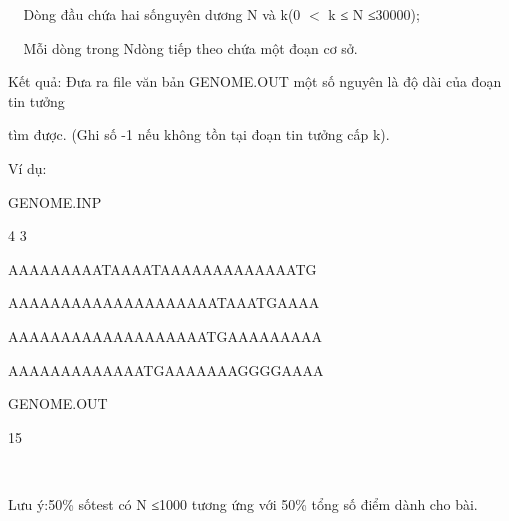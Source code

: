   Dòng đầu chứa hai sốnguyên dương N và k(0 $<$ k ≤ N ≤30000); 

  Mỗi dòng trong Ndòng tiếp theo chứa một đoạn cơ sở.

Kết quả: Đưa ra file văn bản GENOME.OUT một số nguyên là độ dài của đoạn tin tưởng 

tìm được. (Ghi số -1 nếu không tồn tại đoạn tin tưởng cấp k). 

Ví dụ: 

GENOME.INP 

4 3 

AAAAAAAAATAAAATAAAAAAAAAAAAATG

AAAAAAAAAAAAAAAAAAAATAAATGAAAA

AAAAAAAAAAAAAAAAAAATGAAAAAAAAA

AAAAAAAAAAAAATGAAAAAAAGGGGAAAA

GENOME.OUT

15 

 

Lưu ý:50\% sốtest có N ≤1000 tương ứng với 50\% tổng số điểm dành cho bài.

 